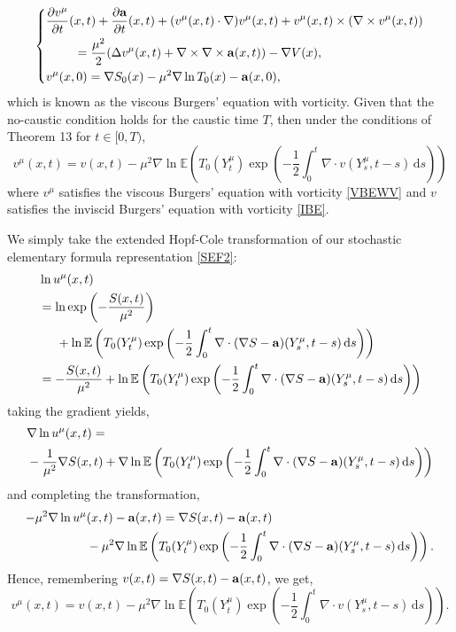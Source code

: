 \documentclass[a4paper,12pt,draft]{report}
\theoremstyle{remark}
\theoremstyle{definition}
\begin{document}
\begin{equation}
\left\{
\begin{aligned}
& \frac{\partial v^\mu}{\partial t}(x, t) + \frac{\partial\bold{a}}{\partial t}(x, t) + (v^\mu(x, t)\cdot\nabla)v^\mu(x, t) + v^\mu(x, t)\times(\nabla\times v^\mu(x, t))\\ \label{VBEWV}
& \hspace{0.8cm} = \frac{\mu^2}{2}(\Delta v^\mu(x, t) + \nabla\times\nabla\times\bold{a}(x, t)) - \nabla V(x),\\
& v^\mu(x, 0) = \nabla S_0(x) - \mu^2\nabla\ln T_0(x) - \bold{a}(x, 0),
\end{aligned}
\right.
\end{equation}
which is known as the viscous Burgers' equation with vorticity.
\cor
{
Given that the no-caustic condition holds for the caustic time $T$, then under the conditions of Theorem 13 for $t \in [0, T)$,
$$
v^\mu(x, t) = v(x, t) - \mu^2\nabla\ln\mathbb{E}\left(T_0(Y_t^\mu)\exp\left(-\frac{1}{2}\int_0^t\nabla\cdot v(Y_s^\mu, t -s)\,\mathrm{d}s\right)\right)
$$
where $v^\mu$ satisfies the viscous Burgers' equation with vorticity \eqref{VBEWV} and $v$ satisfies the inviscid Burgers' equation with vorticity \eqref{IBE}.
}
\proof
{
We simply take the extended Hopf-Cole transformation of our stochastic elementary formula representation \eqref{SEF2}:
\begin{align}
& \ln u^\mu(x, t)\nonumber\\
& = \ln\exp\left(-\frac{S(x, t)}{\mu^2}\right)\nonumber\\
& \hspace{0.5cm} + \ln\mathbb{E}\left(T_0(Y_t^\mu)\exp\left(-\frac{1}{2}\int_0^t\nabla\cdot(\nabla S - \bold{a})(Y_s^\mu, t - s)\,\mathrm{d}s\right)\right)\nonumber\\
& = -\frac{S(x, t)}{\mu^2} + \ln\mathbb{E}\left(T_0(Y_t^\mu)\exp\left(-\frac{1}{2}\int_0^t\nabla\cdot(\nabla S - \bold{a})(Y_s^\mu, t - s)\,\mathrm{d}s\right)\right)\nonumber
\end{align}
taking the gradient yields,
\begin{align}
& \nabla\ln u^\mu(x, t) = \nonumber\\
& -\frac{1}{\mu^2}\nabla S(x, t) + \nabla\ln\mathbb{E}\left(T_0(Y_t^\mu)\exp\left(-\frac{1}{2}\int_0^t\nabla\cdot(\nabla S - \bold{a})(Y_s^\mu, t - s)\,\mathrm{d}s\right)\right)\nonumber
\end{align}
and completing the transformation,
\begin{align}
-\mu^2\nabla\ln u^\mu & (x, t) - \bold{a}(x, t) = \nabla S(x, t) - \bold{a}(x, t)\nonumber\\
& - \mu^2\nabla\ln\mathbb{E}\left(T_0(Y_t^\mu)\exp\left(-\frac{1}{2}\int_0^t\nabla\cdot(\nabla S - \bold{a})(Y_s^\mu, t - s)\,\mathrm{d}s\right)\right).\nonumber
\end{align}
Hence, remembering $v(x, t) = \nabla S(x, t) - \bold{a}(x, t)$, we get,
$$
v^\mu(x, t) = v(x, t) - \mu^2\nabla\ln\mathbb{E}\left(T_0(Y_t^\mu)\exp\left(-\frac{1}{2}\int_0^t\nabla\cdot v(Y_s^\mu, t - s)\,\mathrm{d}s\right)\right).
$$

\qedhere
}
\end{document}
